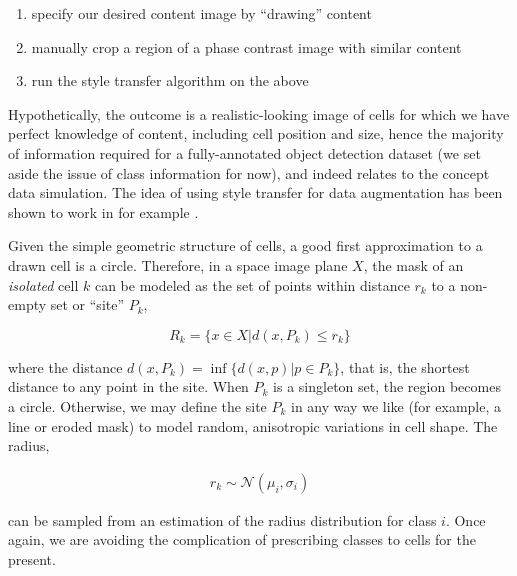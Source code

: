 \begin{enumerate}
\item specify our desired content image by ``drawing'' content
\item manually crop a region of a phase contrast image with similar content
\item run the style transfer algorithm on the above
\end{enumerate}

Hypothetically, the outcome is a realistic-looking image of cells for which we have perfect knowledge of content, including cell position and size, hence the majority of information  required for a fully-annotated object detection dataset (we set aside the issue of class information for now), and indeed relates to the concept data simulation. The idea of using style transfer for data augmentation has been shown to work in for example \cite{zheng2019stada}.

Given the simple geometric structure of cells, a good first approximation to a drawn cell is a circle. Therefore, in a space image plane $X$, the mask of an \emph{isolated} cell $k$ can be modeled as the set of points within distance $r_k$ to a non-empty set or ``site'' $P_k$,

\begin{equation}
R_k = \{x \in X | d(x, P_k) \leq r_k\}
\label{eq:region}
\end{equation}

where the distance $d(x, P_k) = \inf\{d(x, p) | p \in P_k\}$, that is, the shortest distance to any point in the site. When $P_k$ is a singleton set, the region becomes a circle. Otherwise, we may define the site $P_k$ in any way we like (for example, a line or eroded mask) to model random, anisotropic variations in cell shape. The radius,

\begin{align}
r_k \sim \mathcal{N}(\mu_i, \sigma_i)
\label{eq:radius_dist}
\end{align}

can be sampled from an estimation of the radius distribution for class $i$. Once again, we are avoiding the complication of prescribing classes to cells for the present.

